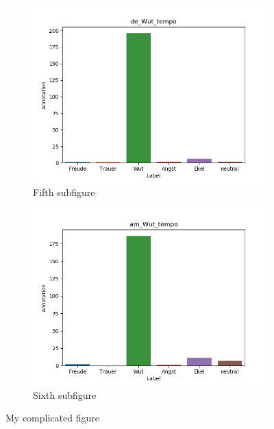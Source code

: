 \documentclass[11pt,a4paper,headsepline,twoside,toc=bibliography]{scrreprt}
\begin{document}
\begin{figure}[t!]
	\medskip
	\begin{subfigure}{0.48\textwidth}
		\includegraphics[width=\linewidth]{plots/de_Wut_tempo.png}
		\caption{Fifth subfigure} \label{fig:de_W_tempo}
	\end{subfigure}\hspace*{\fill}
	\begin{subfigure}{0.48\textwidth}
		\includegraphics[width=\linewidth]{plots/am_Wut_tempo.png}
		\caption{Sixth subfigure} \label{fig:am__W_tempo}
	\end{subfigure}
	
	\caption{My complicated figure} \label{fig:countplots_W}
\end{figure}
\end{document}
